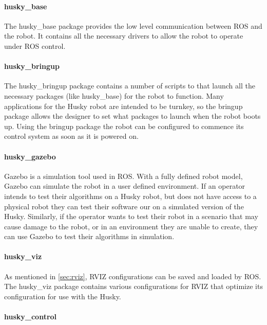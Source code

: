 \paragraph{husky\_base}

The husky\_base package provides the low level communication between ROS and the robot. It contains all the necessary drivers to allow the robot to operate under ROS control.\\

\paragraph{husky\_bringup}

The husky\_bringup package contains a number of scripts to that launch all the necessary packages (like husky\_base) for the robot to function. Many applications for the Husky robot are intended to be turnkey, so the bringup package allows the designer to set what packages to launch when the robot boots up. Using the bringup package the robot can be configured to commence its control system as soon as it is powered on.\\

\paragraph{husky\_gazebo}

Gazebo is a simulation tool used in ROS. With a fully defined robot model, Gazebo can simulate the robot in a user defined environment. If an operator intends to test their algorithms on a Husky robot, but does not have access to a physical robot they can test their software our on a simulated version of the Husky. Similarly, if the operator wants to test their robot in a scenario that may cause damage to the robot, or in an environment they are unable to create, they can use Gazebo to test their algorithms in simulation.\\

\paragraph{husky\_viz}

As mentioned in \ref{sec:rviz}, RVIZ configurations can be saved and loaded by ROS. The husky\_viz package contains various configurations for RVIZ that optimize its configuration for use with the Husky.\\

\paragraph{husky\_control}

